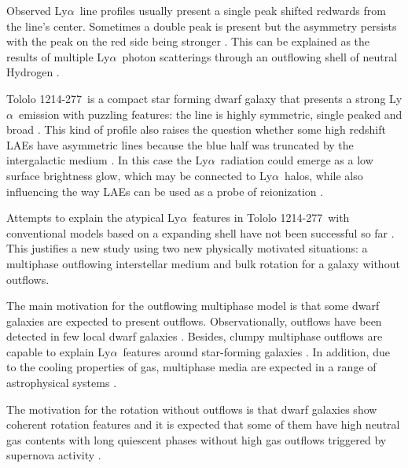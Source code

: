 \documentclass[a4paper,fleqn,usenatbib]{mnras}
\newcommand{\tol}{Tololo 1214-277}
\newcommand{\lya}{\ifmmode{{\rm Ly}\alpha}\else Ly$\alpha$\ \fi}
\begin{document}
Observed \lya line profiles usually present a single peak shifted
redwards from the line's center. 
Sometimes a double peak is present but the asymmetry persists with 
the peak on the red side being stronger \citep[e.g.][]{2010ApJ...717..289S,Erb14,Trainor16}. 
This can be explained as the results of multiple \lya photon
scatterings through an outflowing shell of neutral Hydrogen
\citep{2006A&A...460..397V,Orsi12,2012ApJ...751...29Y,2015ApJ...812..123G}.

\tol\ is a compact star forming dwarf galaxy that presents a
strong \lya emission with puzzling 
features: the line is highly symmetric, single peaked and broad 
\citep{Thuan97}.
This kind of profile also raises the question whether some high
redshift LAEs have asymmetric lines because the blue half was
truncated by the intergalactic medium \citep{2007MNRAS.377.1175D}. 
In this case the \lya radiation could emerge as a low surface
brightness glow, which may be connected to \lya halos, while also
influencing the way LAEs can be used as a probe of reionization
\citep[see the review by][and references therein]{2014PASA...31...40D}. 

Attempts to explain the atypical \lya features in \tol\ with
conventional models based on a expanding shell have not been successful
so far \citep{mashesse03,2015A&A...578A...7V}. 
This justifies a new study using two new physically motivated
situations: a multiphase outflowing interstellar medium and bulk rotation for a
galaxy without outflows.

The main motivation for the outflowing multiphase model \citep[as presented
in][]{Gronke2016} is that some dwarf galaxies are expected to
present outflows.  
Observationally, outflows have been detected in few local dwarf galaxies
\citep{1998ApJ...506..222M,2005MNRAS.358.1453O}. 
Besides, clumpy multiphase outflows are capable to explain \lya features around
star-forming galaxies
\citep{2010ApJ...717..289S,2012MNRAS.424.1672D}.
In addition, due to the cooling properties of gas, multiphase media are expected
in a range of astrophysical systems
\citep[][]{1977ApJ...218..148M}. 

The motivation for the rotation without outflows 
\citep[as presented in][]{GaravitoCamargo2014} is that dwarf galaxies show coherent
rotation features  \citep{2009A&A...493..871S} and it is expected that
some of them have high neutral gas contents with long quiescent phases
without high gas outflows triggered by supernova activity
\citep{2005A&A...433L...1B,2008ApJ...672..888T,2013MNRAS.434.2491G}.   
\end{document}
